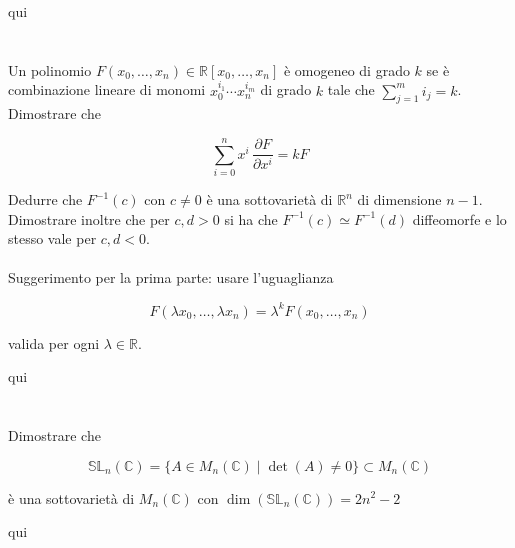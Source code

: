 qui

\section{}\label{es2-15}

\begin{tcolorbox}
	Un polinomio $ F(x_{0},\dots,x_{n}) \in \mathbb{R}[x_{0},\dots,x_{n}] $ è omogeneo di grado $ k $ se è combinazione lineare di monomi $ x_{0}^{i_{1}} \cdots x_{n}^{i_{m}} $ di grado $ k $ tale che $ \sum_{j=1}^{m} i_{j} = k $. Dimostrare che
	
	\begin{equation}
		\sum_{i=0}^{n} x^{i} \, \dfrac{\partial F}{\partial x^{i}} = k F
	\end{equation}

	Dedurre che $ F^{-1}(c) $ con $ c \neq 0 $ è una sottovarietà di $ \mathbb{R}^{n} $ di dimensione $ n-1 $. Dimostrare inoltre che per $ c,d>0 $ si ha che $ F^{-1}(c) \simeq F^{-1}(d) $ diffeomorfe e lo stesso vale per $ c,d<0 $.\\\\
	Suggerimento per la prima parte: usare l'uguaglianza
	
	\begin{equation}
		F(\lambda x_{0},\dots,\lambda x_{n}) = \lambda^{k} F(x_{0},\dots,x_{n})
	\end{equation}
	
	valida per ogni $ \lambda \in \mathbb{R} $.
\end{tcolorbox}

qui

\section{}\label{es2-16}

\begin{tcolorbox}
	Dimostrare che
	
	\begin{equation}
		\mathbb{SL}_{n}(\mathbb{C}) = \{ A \in M_{n}(\mathbb{C}) \mid \det(A) \neq 0 \} \subset M_{n}(\mathbb{C})
	\end{equation}

	è una sottovarietà di $ M_{n}(\mathbb{C}) $ con $ \dim(\mathbb{SL}_{n}(\mathbb{C})) = 2n^{2}-2  $
\end{tcolorbox}

qui

\section{}\label{es2-17}


